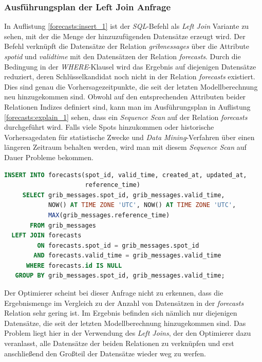 \subsubsection{Ausführungsplan der Left Join Anfrage}
In Auflistung \ref{forecasts:insert_1} ist der \textit{SQL}-Befehl als
\textit{Left Join} Variante zu sehen, mit der die Menge der
hinzuzufügenden Datensätze erzeugt wird. Der Befehl verknüpft die
Datensätze der Relation \textit{grib\textunderscore messages} über die
Attribute \textit{spot\textunderscore id} und
\textit{valid\textunderscore time} mit den Datensätzen der Relation
\textit{forecasts}. Durch die Bedingung in der \textit{WHERE}-Klausel
wird das Ergebnis auf diejenigen Datensätze reduziert, deren
Schlüsselkandidat noch nicht in der Relation \textit{forecasts}
existiert. Dies sind genau die Vorhersagezeitpunkte, die seit der
letzten Modellberechnung neu hinzugekommen sind. Obwohl auf den
entsprechenden Attributen beider Relationen Indizes definiert sind,
kann man im Ausführungsplan in Auflistung \ref{forecasts:explain_1}
sehen, dass ein \textit{Sequence Scan} auf der Relation
\textit{forecasts} durchgeführt wird. Falls viele Spots hinzukommen
oder historische Vorhersagedaten für statistische Zwecke und
\textit{Data Mining}-Verfahren über einen längeren Zeitraum behalten
werden, wird man mit diesem \textit{Sequence Scan} auf Dauer Probleme
bekommen.

\begin{lstlisting}[captionpos=b, caption=Hinzufügen von Datensätze mittels \textit{Left Join}, label=forecasts:insert_1, language=SQL]
INSERT INTO forecasts(spot_id, valid_time, created_at, updated_at, 
                      reference_time)
     SELECT grib_messages.spot_id, grib_messages.valid_time, 
            NOW() AT TIME ZONE 'UTC', NOW() AT TIME ZONE 'UTC', 
            MAX(grib_messages.reference_time)
       FROM grib_messages
  LEFT JOIN forecasts
         ON forecasts.spot_id = grib_messages.spot_id
        AND forecasts.valid_time = grib_messages.valid_time
      WHERE forecasts.id IS NULL
   GROUP BY grib_messages.spot_id, grib_messages.valid_time;
\end{lstlisting}

Der Optimierer scheint bei dieser Anfrage nicht zu erkennen,
dass die Ergebnismenge im Vergleich zu der Anzahl von Datensätzen in
der \textit{forecasts} Relation sehr gering ist. Im Ergebnis befinden
sich nämlich nur diejenigen Datensätze, die seit der letzten
Modellberechnung hinzugekommen sind. Das Problem liegt hier in der
Verwendung des \textit{Left Joins}, der den Optimierer dazu
veranlasst, alle Datensätze der beiden Relationen zu verknüpfen und
erst anschließend den Großteil der Datensätze wieder weg zu werfen.

